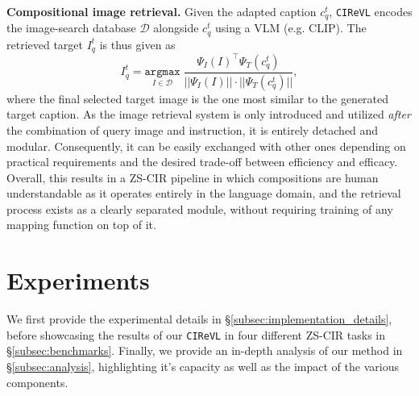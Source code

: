\documentclass{article} \usepackage{iclr2024_conference,times}
\newcommand{\methodName}{\texttt{CIReVL}\xspace} \newcommand{\methodNameNS}{\texttt{CIReVL}}
\begin{document}
\textbf{Compositional image retrieval.}
Given the adapted caption $c_q^t$, \methodName encodes the image-search database $\mathcal{D}$ alongside $c_q^t$ using a VLM (e.g. CLIP). The retrieved target $I_q^t$ is thus given as
\begin{equation}
    \label{eq:retrieval}
    I_q^t = \underset{I\in\mathcal{D}}{\mathtt{argmax}}\; \frac{{\Psi_I(I)}^\intercal \Psi_T(c_q^t)}{||\Psi_I(I)|| \cdot ||\Psi_T(c_q^t)||},
\end{equation}
where the final selected target image is the one most similar to the generated target caption. As the image retrieval system is only introduced and utilized \textit{after} the combination of query image and instruction, it is entirely detached and modular. Consequently, it can be easily exchanged with other ones depending on practical requirements and the desired trade-off between efficiency and efficacy.
Overall, this results in a ZS-CIR pipeline in which compositions are human understandable as it operates entirely in the language domain, and the retrieval process exists as a clearly separated module, without requiring training of any mapping function on top of it.










\section{Experiments}
\label{sec:experiments}
We first provide the experimental details in \S\ref{subsec:implementation_details}, before showcasing the results of our \methodName in four different ZS-CIR tasks in \S\ref{subsec:benchmarks}.
Finally, we provide an in-depth analysis of our method in \S\ref{subsec:analysis}, highlighting it's capacity as well as the impact of the various components. 
\end{document}
